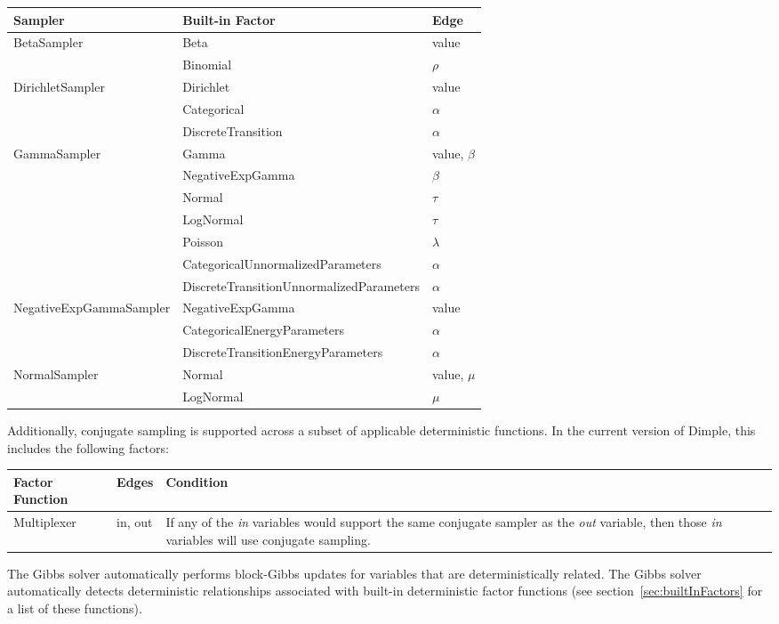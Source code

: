 \begin{longtable} {l p{7.1cm} p{2.5cm}}
Sampler & Built-in Factor & Edge \\
\hline
\endhead
BetaSampler & Beta & value \\
 & Binomial & $\rho$ \\
DirichletSampler & Dirichlet & value \\
 & Categorical & $\alpha$ \\
 & DiscreteTransition & $\alpha$ \\
GammaSampler & Gamma & value, $\beta$ \\
 & NegativeExpGamma & $\beta$ \\
 & Normal & $\tau$ \\
 & LogNormal & $\tau$ \\
 & Poisson & $\lambda$ \\
 & CategoricalUnnormalizedParameters & $\alpha$ \\
 & DiscreteTransitionUnnormalizedParameters & $\alpha$ \\
NegativeExpGammaSampler & NegativeExpGamma & value \\
 & CategoricalEnergyParameters & $\alpha$ \\ 
 & DiscreteTransitionEnergyParameters & $\alpha$ \\ 
NormalSampler & Normal & value, $\mu$ \\
 & LogNormal & $\mu$ \\
\end{longtable}

Additionally, conjugate sampling is supported across a subset of applicable deterministic functions.  In the current version of Dimple, this includes the following factors:

\begin{longtable} {l p{2cm} p{9cm}}
Factor Function & Edges & Condition \\
\hline
\endhead
Multiplexer & in, out & If any of the \emph{in} variables would support the same conjugate sampler as the \emph{out} variable, then those \emph{in} variables will use conjugate sampling. \\
\end{longtable}


The Gibbs solver automatically performs block-Gibbs updates for variables that are deterministically related.  The Gibbs solver automatically detects deterministic relationships associated with built-in deterministic factor functions (see section~\ref{sec:builtInFactors} for a list of these functions).  

